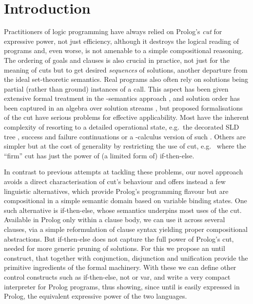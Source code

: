 \documentclass{tlp}
\def\mite{\textsf{if-then-else}}
\begin{document}
\section{Introduction}

Practitioners of logic programming have always relied on Prolog's \emph{cut} for
expressive power, not just efficiency, although it destroys the logical reading
of programs and, even worse, is not amenable to a simple compositional reasoning.
The ordering of goals and clauses is also crucial in practice, not just for the
meaning of cuts but to get desired \emph{sequences} of solutions, another
departure from the ideal set-theoretic semantics. Real programs also often rely
on solutions being partial (rather than ground) instances of a call. This aspect
has been given extensive formal treatment in the -semantics approach
\cite{bo_ga_:94:ssata}, and solution order has been captured in an algebra over
solution streams \cite{se_sp_ho:99:alp}, but proposed formalisations of the cut
have serious problems for effective applicability. Most have the inherent
complexity of resorting to a detailed operational state, e.g.\ the decorated SLD
tree \cite{de_mi:88:dosp,sp:00:ogidspc}, success and failure continuations
\cite{dBr_dVi:89:cspc} or a -calculus version of such
\cite{li:94:pcsp}. Others are simpler but at the cost of generality by
restricting the use of cut, e.g.\ \cite{And:03:wpspc} where the ``firm'' cut has
just the power of (a limited form of) \mite{}.

In contrast to previous attempts at tackling these problems, our novel approach
avoids a direct characterisation of cut's behaviour and offers instead a few 
linguistic alternatives, which provide Prolog's programming flavour but are
compositional in a simple semantic domain based on variable binding states. One
such alternative is \textsf{if-then-else}, whose semantics
underpins most uses of the cut. Available in Prolog
only within a clause body, we can use it across several clauses,
via a simple reformulation of clause syntax yielding proper compositional
abstractions. But \textsf{if-then-else} does not capture the full power of
Prolog's cut, needed for more generic pruning of solutions. For this we
propose an \textsf{until} construct, that together with conjunction, disjunction
and unification provide the primitive ingredients of the formal machinery. With
these we can define other control constructs such as \textsf{if-then-else},
\textsf{not} or \textsf{var}, and write a very compact interpreter for Prolog
programs, thus showing, since \textsf{until} is easily expressed in Prolog, the
equivalent expressive power of the two languages.
\end{document}
